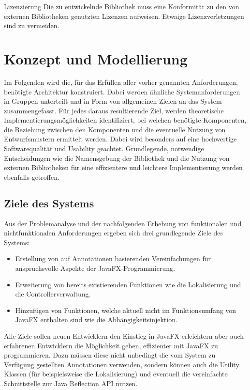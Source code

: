 \begin{nreq}{Lizenzierung}
	Die zu entwickelnde Bibliothek muss eine Konformität zu den von externen Bibliotheken genutzten Lizenzen aufweisen. Etwaige Lizenzverletzungen sind zu vermeiden.
\end{nreq}
\section{Konzept und Modellierung}
\label{konzept_und_modellierung}
Im Folgenden wird die, für das Erfüllen aller vorher genannten Anforderungen, benötigte Architektur konstruiert. Dabei werden ähnliche Systemanforderungen in Gruppen unterteilt und in Form von allgemeinen Zielen an das System zusammengefasst. Für jedes daraus resultierende Ziel, werden theoretische Implementierungsmöglichkeiten identifiziert, bei welchen benötigte Komponenten, die Beziehung zwischen den Komponenten und die eventuelle Nutzung von Entwurfsmustern ermittelt werden. Dabei wird besonders auf eine hochwertige Softwarequalität und Usability geachtet. Grundlegende, notwendige Entscheidungen wie die Namensgebung der Bibliothek und die Nutzung von externen Bibliotheken für eine effizientere und leichtere Implementierung werden ebenfalls getroffen. 
\subsection{Ziele des Systems}
Aus der Problemanalyse und der nachfolgenden Erhebung von funktionalen und nichtfunktionalen Anforderungen ergeben sich drei grundlegende Ziele des Systems:
\begin{itemize}
	\item Erstellung von auf Annotationen basierenden Vereinfachungen für anspruchsvolle Aspekte der JavaFX-Programmierung.
	\item Erweiterung von bereits existierenden Funktionen wie die Lokalisierung und die Controllerverwaltung.
	\item Hinzufügen von Funktionen, welche aktuell nicht im Funktionsumfang von JavaFX enthalten sind wie die Abhängigkeitsinjektion.
\end{itemize}
Alle Ziele sollen neuen Entwicklern den Einstieg in JavaFX erleichtern aber auch erfahrenen Entwicklern die Möglichkeit geben, effizienter mit JavaFX zu programmieren. Dazu müssen diese nicht unbedingt die vom System zu Verfügung gestellten Annotationen verwenden, sondern können auch die Utility Klassen (für beispielsweise die Lokalisierung) und eventuell die vereinfachte Schnittstelle zur Java Reflection API nutzen.
